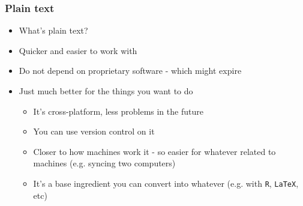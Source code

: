 \documentclass[utf8, xcolor=dvipsnames, handout]{beamer}
\begin{document}
\begin{frame}
\frametitle{Plain text}
\centering

\begin{itemize}[<+->]
  \item What's plain text?
  \item Quicker and easier to work with
  \item Do not depend on proprietary software - which might expire
  \item Just much better for the things you want to do
  \begin{itemize}
    \item It's cross-platform, less problems in the future
    \item You can use version control on it
    \item Closer to how machines work it - so easier for whatever related to machines (e.g. syncing two computers)
    \item It's a base ingredient you can convert into whatever (e.g. with \texttt{R}, \texttt{LaTeX}, etc)
  \end{itemize}
\end{itemize}

\end{frame}
\end{document}
